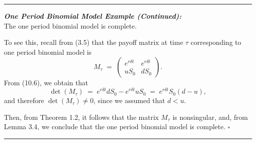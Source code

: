 \medskip
\noindent\rule{\linewidth}{0.4pt}
\medskip

\noindent\textbf{\textit{One Period Binomial Model Example (Continued):}}\\
The one period binomial model is complete.

To see this, recall from (3.5) that the payoff matrix at time $\tau$
corresponding to one period binomial model is
\[
M_\tau \;=\; \begin{pmatrix} e^{r\delta t} & e^{r\delta t} \\ uS_0 & dS_0
\end{pmatrix}.
\]
From (10.6), we obtain that
\[
\det(M_\tau) \;=\; e^{r\delta t}dS_0 - e^{r\delta t}uS_0 \;=\;
e^{r\delta t}S_0(d - u),
\]
and therefore $\det(M_\tau) \neq 0$, since we assumed that $d < u$.

Then, from Theorem 1.2, it follows that the matrix $M_\tau$ is
nonsingular, and, from Lemma 3.4, we conclude that the one period binomial
model is complete. \hfill$\square$

\medskip
\noindent\rule{\linewidth}{0.4pt}
\medskip
